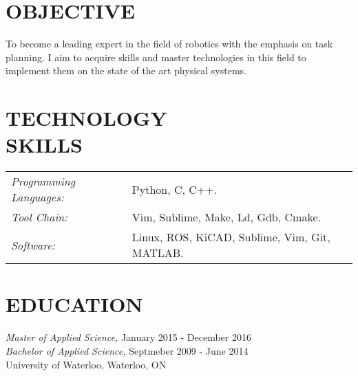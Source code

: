 \documentclass[margin, 10pt]{res} %
\begin{document}
\begin{resume}

 
\section{OBJECTIVE}  
To become a leading expert in the field of robotics with the emphasis on task planning. I aim to acquire skills and master technologies in this field to implement them on the state of the art physical systems.
 

\section{TECHNOLOGY \\ SKILLS} 

\begin{tabular}{ l l }
{\sl Programming Languages:} &Python, C, C++. \\
{\sl Tool Chain:} &Vim, Sublime, Make, Ld, Gdb, Cmake. \\
{\sl Software:} &Linux, ROS, KiCAD, Sublime, Vim, Git, MATLAB. \\
\end{tabular}


\section{EDUCATION}

{\sl Master of Applied Science,}  \hfill January 2015 - December 2016 \\
{\sl Bachelor of Applied Science,}  \hfill Septmeber 2009 - June 2014 \\
University of Waterloo, Waterloo, ON\\
 

\end{resume}
\end{document}
